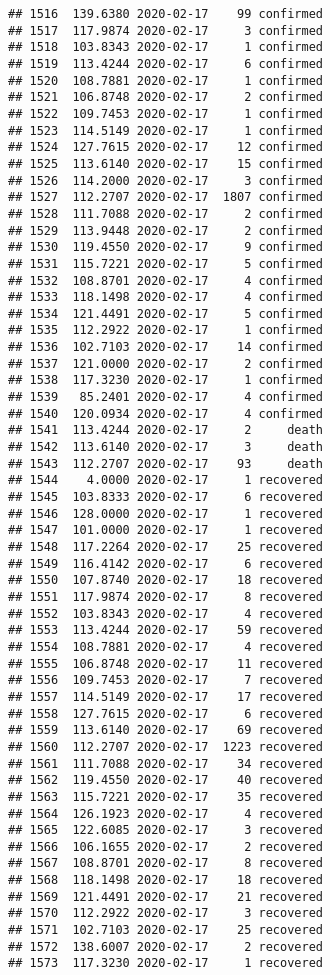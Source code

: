 \documentclass[
]{article}
\begin{document}
\begin{verbatim}
## 1516  139.6380 2020-02-17    99 confirmed
## 1517  117.9874 2020-02-17     3 confirmed
## 1518  103.8343 2020-02-17     1 confirmed
## 1519  113.4244 2020-02-17     6 confirmed
## 1520  108.7881 2020-02-17     1 confirmed
## 1521  106.8748 2020-02-17     2 confirmed
## 1522  109.7453 2020-02-17     1 confirmed
## 1523  114.5149 2020-02-17     1 confirmed
## 1524  127.7615 2020-02-17    12 confirmed
## 1525  113.6140 2020-02-17    15 confirmed
## 1526  114.2000 2020-02-17     3 confirmed
## 1527  112.2707 2020-02-17  1807 confirmed
## 1528  111.7088 2020-02-17     2 confirmed
## 1529  113.9448 2020-02-17     2 confirmed
## 1530  119.4550 2020-02-17     9 confirmed
## 1531  115.7221 2020-02-17     5 confirmed
## 1532  108.8701 2020-02-17     4 confirmed
## 1533  118.1498 2020-02-17     4 confirmed
## 1534  121.4491 2020-02-17     5 confirmed
## 1535  112.2922 2020-02-17     1 confirmed
## 1536  102.7103 2020-02-17    14 confirmed
## 1537  121.0000 2020-02-17     2 confirmed
## 1538  117.3230 2020-02-17     1 confirmed
## 1539   85.2401 2020-02-17     4 confirmed
## 1540  120.0934 2020-02-17     4 confirmed
## 1541  113.4244 2020-02-17     2     death
## 1542  113.6140 2020-02-17     3     death
## 1543  112.2707 2020-02-17    93     death
## 1544    4.0000 2020-02-17     1 recovered
## 1545  103.8333 2020-02-17     6 recovered
## 1546  128.0000 2020-02-17     1 recovered
## 1547  101.0000 2020-02-17     1 recovered
## 1548  117.2264 2020-02-17    25 recovered
## 1549  116.4142 2020-02-17     6 recovered
## 1550  107.8740 2020-02-17    18 recovered
## 1551  117.9874 2020-02-17     8 recovered
## 1552  103.8343 2020-02-17     4 recovered
## 1553  113.4244 2020-02-17    59 recovered
## 1554  108.7881 2020-02-17     4 recovered
## 1555  106.8748 2020-02-17    11 recovered
## 1556  109.7453 2020-02-17     7 recovered
## 1557  114.5149 2020-02-17    17 recovered
## 1558  127.7615 2020-02-17     6 recovered
## 1559  113.6140 2020-02-17    69 recovered
## 1560  112.2707 2020-02-17  1223 recovered
## 1561  111.7088 2020-02-17    34 recovered
## 1562  119.4550 2020-02-17    40 recovered
## 1563  115.7221 2020-02-17    35 recovered
## 1564  126.1923 2020-02-17     4 recovered
## 1565  122.6085 2020-02-17     3 recovered
## 1566  106.1655 2020-02-17     2 recovered
## 1567  108.8701 2020-02-17     8 recovered
## 1568  118.1498 2020-02-17    18 recovered
## 1569  121.4491 2020-02-17    21 recovered
## 1570  112.2922 2020-02-17     3 recovered
## 1571  102.7103 2020-02-17    25 recovered
## 1572  138.6007 2020-02-17     2 recovered
## 1573  117.3230 2020-02-17     1 recovered

\end{verbatim}
\end{document}

